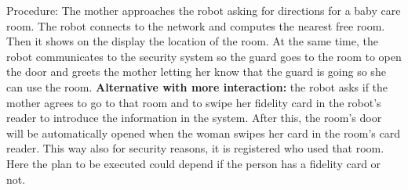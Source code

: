 Procedure: 
The mother approaches the robot asking for directions for a baby care room. The robot connects to the network and computes the nearest free room. Then it shows on the display the location of the room. At the same time, the robot communicates to the security system so the guard goes to the room to open the door and greets the mother letting her know that the guard is going so she can use the room. \textbf{Alternative with more interaction:} the robot asks if the mother agrees to go to that room and to swipe her fidelity card in the robot's reader to introduce the information in the system. After this, the room's door will be automatically opened when the woman swipes her card in the room's card reader. This way also for security reasons, it is registered who used that room.
{\color{blue} Here the plan to be executed could depend if the person has a fidelity card or not.}









